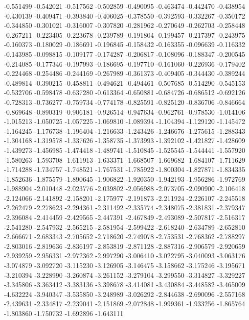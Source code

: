 -0.551499
-0.542021
-0.517562
-0.502859
-0.490095
-0.463474
-0.442470
-0.438954
-0.430139
-0.409471
-0.393840
-0.406025
-0.378550
-0.392593
-0.332267
-0.350172
-0.344850
-0.301021
-0.316007
-0.307820
-0.281962
-0.270649
-0.262703
-0.258448
-0.267211
-0.223405
-0.223678
-0.239789
-0.191804
-0.199457
-0.217397
-0.243975
-0.160373
-0.180029
-0.186691
-0.196845
-0.158432
-0.163355
-0.096639
-0.116332
-0.143985
-0.098815
-0.109177
-0.174287
-0.206817
-0.108096
-0.188347
-0.200545
-0.214085
-0.177346
-0.197993
-0.186695
-0.197710
-0.161060
-0.226936
-0.179402
-0.224468
-0.254486
-0.244169
-0.267989
-0.361373
-0.409405
-0.344430
-0.389244
-0.489814
-0.390215
-0.458811
-0.494621
-0.494461
-0.507685
-0.514290
-0.545153
-0.532706
-0.598478
-0.637280
-0.613364
-0.650881
-0.684726
-0.686512
-0.692126
-0.728313
-0.736277
-0.759734
-0.774178
-0.825591
-0.825120
-0.836706
-0.846664
-0.869648
-0.890319
-0.906181
-0.926514
-0.947634
-0.962761
-0.978530
-1.014106
-1.015213
-1.050725
-1.057225
-1.069810
-1.089394
-1.104394
-1.129120
-1.145472
-1.164245
-1.176738
-1.196404
-1.216633
-1.243426
-1.246676
-1.275615
-1.288343
-1.304168
-1.319578
-1.337626
-1.358735
-1.373993
-1.392102
-1.421827
-1.428609
-1.439273
-1.456985
-1.474418
-1.489741
-1.510845
-1.525545
-1.544441
-1.557920
-1.580263
-1.593708
-1.611913
-1.633371
-1.668507
-1.669682
-1.684107
-1.711629
-1.714288
-1.734757
-1.748521
-1.767531
-1.785922
-1.800304
-1.827871
-1.834335
-1.852636
-1.875579
-1.890645
-1.906822
-1.920350
-1.942193
-1.956286
-1.972769
-1.988904
-2.010448
-2.023776
-2.039802
-2.056988
-2.073705
-2.090900
-2.106418
-2.124066
-2.141892
-2.158201
-2.175977
-2.191873
-2.211924
-2.226107
-2.245518
-2.262479
-2.278623
-2.294361
-2.311492
-2.335774
-2.348075
-2.381831
-2.379347
-2.396084
-2.414459
-2.429565
-2.447391
-2.467849
-2.493089
-2.507817
-2.516317
-2.541280
-2.547932
-2.565215
-2.581954
-2.599422
-2.618240
-2.634789
-2.652810
-2.666671
-2.683343
-2.705652
-2.718620
-2.749078
-2.753531
-2.768362
-2.788297
-2.803016
-2.819636
-2.836197
-2.853819
-2.871128
-2.887316
-2.906579
-2.920659
-2.939259
-2.956331
-2.972362
-2.997290
-3.006410
-3.022795
-3.040093
-3.063176
-3.074879
-3.092720
-3.115230
-3.126905
-3.146475
-3.158662
-3.175246
-3.195671
-3.210394
-3.228990
-3.260874
-3.261152
-3.279104
-3.299550
-3.314827
-3.329227
-3.345806
-3.363412
-3.383136
-3.398678
-3.414081
-3.430884
-3.448582
-3.465009
-4.632224
-3.940347
-3.535850
-3.248989
-3.026292
-2.844638
-2.690096
-2.557168
-2.439631
-2.334817
-2.239041
-2.151869
-2.072848
-1.999361
-1.933256
-1.865764
-1.803860
-1.750732
-1.692896
-1.643111
